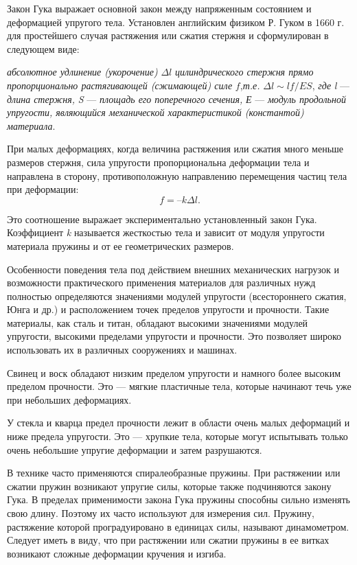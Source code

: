 \documentclass[14pt,a4paper,oneside]{extarticle}	%
\begin{document}
Закон Гука выражает основной закон между напряженным состоянием и деформацией упругого тела. 
Установлен английским физиком Р. Гуком в 1660 г. для простейшего случая растяжения или сжатия стержня и сформулирован в следующем виде:
 
\begin{flushleft}
	\textit{абсолютное удлинение (укорочение)} $ \Delta l $ \textit{цилиндрического стержня прямо пропорционально растягивающей (сжимающей) силе} $ f $,\textit{т.е.} $ \Delta l \sim lf/ES$, \textit{где} \textit{l} — \textit{длина стержня,} \textit{S} — \textit{площадь его поперечного сечения,} \textit{Е} — \textit{модуль продольной упругости, являющийся механической характеристикой (константой) материала}. 
\end{flushleft}

При малых деформациях, когда величина растяжения или сжатия много меньше размеров стержня, сила упругости пропорциональна деформации тела и направлена в сторону, противоположную направлению перемещения частиц тела при деформации: 
\begin{equation}\label{Hooke-1eq1}
f = –k\Delta l.
\end{equation}

Это соотношение выражает экспериментально установленный закон Гука. 
Коэффициент \textit{k} называется жесткостью тела и зависит от модуля упругости материала пружины и от ее 
геометрических размеров. 

Особенности поведения тела под действием внешних механических нагрузок и возможности практического применения материалов для различных нужд полностью определяются значениями 
модулей упругости (всестороннего сжатия, Юнга и др.) и расположением точек пределов упругости и прочности. 
Такие материалы, как сталь и титан, обладают высокими значениями модулей упругости, высокими пределами упругости и прочности.
Это позволяет широко использовать их в различных сооружениях и машинах. 

Свинец и воск обладают низким пределом упругости и намного 
более высоким пределом прочности.
Это — мягкие пластичные тела, которые начинают течь уже при небольших деформациях. 

У стекла и кварца предел прочности лежит в области очень малых деформаций и ниже предела упругости.
Это — хрупкие тела, которые могут испытывать только очень небольшие упругие деформации и затем разрушаются. 

В технике часто применяются спиралеобразные пружины.
При растяжении или сжатии пружин возникают упругие силы, которые также подчиняются закону Гука.
В пределах применимости закона Гука пружины способны сильно изменять свою длину.
Поэтому их часто используют для измерения сил. 
Пружину, растяжение которой проградуировано в единицах силы, называют динамометром.
Следует иметь в виду, что при растяжении или сжатии пружины в ее витках возникают сложные деформации кручения и изгиба.
\end{document}
